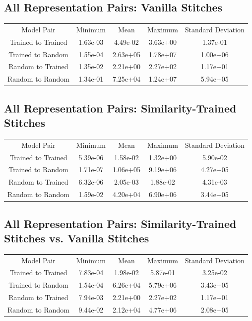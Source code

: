 \documentclass{article} %
\begin{document}
\label{Table4}
\subsection*{All Representation Pairs: Vanilla Stitches}
\begin{tabular}{c c c c c}
   Model Pair&Minimum&Mean&Maximum&Standard Deviation\\
   Trained to Trained&1.63e-03&4.49e-02&3.63e+00&1.37e-01\\
   Trained to Random&1.55e-04&2.63e+05&1.78e+07&1.00e+06\\
   Random to Trained&1.35e-02&2.21e+00&2.27e+02&1.17e+01\\
   Random to Random&1.34e-01&7.25e+04&1.24e+07&5.94e+05\\
\end{tabular}

\label{Table5}
\subsection*{All Representation Pairs: Similarity-Trained Stitches}
\begin{tabular}{c c c c c}
   Model Pair&Minimum&Mean&Maximum&Standard Deviation\\
   Trained to Trained&5.39e-06&1.58e-02&1.32e+00&5.90e-02\\
   Trained to Random&1.71e-07&1.06e+05&9.19e+06&4.27e+05\\
   Random to Trained&6.32e-06&2.05e-03&1.88e-02&4.31e-03\\
   Random to Random&1.59e-02&4.20e+04&6.90e+06&3.44e+05\\
\end{tabular}

\label{Table6}
\subsection*{All Representation Pairs: Similarity-Trained Stitches vs. Vanilla Stitches}
\begin{tabular}{c c c c c}
   Model Pair&Minimum&Mean&Maximum&Standard Deviation\\
   Trained to Trained&7.83e-04&1.98e-02&5.87e-01&3.25e-02\\
   Trained to Random&1.54e-04&6.26e+04&5.79e+06&3.43e+05\\
   Random to Trained&7.94e-03&2.21e+00&2.27e+02&1.17e+01\\
   Random to Random&9.44e-02&2.12e+04&4.77e+06&2.08e+05\\
\end{tabular}
\end{document}
